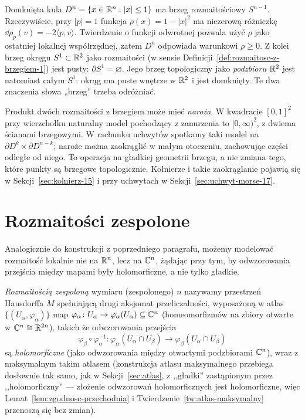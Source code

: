 \begin{przyklad}
\label{prz:brzeg-kula-okrag-1}
Domknięta kula $D^n=\{x\in\mathbb{R}^n:|x|\leq1\}$ ma brzeg
rozmaitościowy $S^{n-1}$. Rzeczywiście, przy $|p|=1$
funkcja $\rho(x)=1-|x|^2$ ma niezerową różniczkę
$\dd\rho_p(v)=-2\langle p,v\rangle$. Twierdzenie o funkcji
odwrotnej pozwala użyć $\rho$ jako ostatniej lokalnej
współrzędnej, zatem $D^n$ odpowiada warunkowi $\rho\geq0$.
Z kolei brzeg okręgu $S^1\subset\mathbb{R}^2$ jako rozmaitości
(w sensie Definicji~\ref{def:rozmaitosc-z-brzegiem-1})
jest pusty: $\partial S^1=\varnothing$. Jego brzeg topologiczny
jako \emph{podzbioru $\mathbb{R}^2$} jest natomiast całym $S^1$: okrąg ma
puste wnętrze w $\mathbb{R}^2$ i jest domknięty.
Te dwa znaczenia słowa „brzeg” trzeba odróżniać.
\end{przyklad}

Produkt dwóch rozmaitości z brzegiem może mieć
\emph{naroża}. W kwadracie $[0,1]^2$ przy wierzchołku
naturalny model pochodzący z zanurzenia to
$[0,\infty)^2$, z dwiema ścianami brzegowymi.
W rachunku uchwytów spotkamy taki model na
$\partial D^k\times\partial D^{n-k}$; naroże można
zaokrąglić w małym otoczeniu, zachowując części
odległe od niego. To operacja na gładkiej geometrii
brzegu, a nie zmiana tego, które punkty są brzegowe
topologicznie. Kołnierze i takie zaokrąglanie pojawią się
w Sekcji~\ref{sec:kolnierz-15} i przy uchwytach w
Sekcji~\ref{sec:uchwyt-morse-17}.

\section{Rozmaitości zespolone}

Analogicznie do konstrukcji z poprzedniego paragrafu, możemy modelować rozmaitość lokalnie
nie na $\mathbb{R}^n$, lecz na $\mathbb{C}^n$, żądając przy tym, by odwzorowania przejścia między mapami
były holomorficzne, a nie tylko gładkie.

\begin{definicja}
\emph{Rozmaitością zespoloną} wymiaru (zespolonego) $n$ nazywamy przestrzeń Hausdorffa $M$
spełniającą drugi aksjomat przeliczalności, wyposażoną w atlas $\{(U_\alpha,\varphi_\alpha)\}$
map $\varphi_\alpha\colon U_\alpha\to\varphi_\alpha(U_\alpha)\subseteq\mathbb{C}^n$ (homeomorfizmów
na zbiory otwarte w $\mathbb{C}^n\cong\mathbb{R}^{2n}$), takich że odwzorowania przejścia
\[
\varphi_\beta\circ\varphi_\alpha^{-1}\colon\varphi_\alpha(U_\alpha\cap U_\beta)\to
\varphi_\beta(U_\alpha\cap U_\beta)
\]
są \emph{holomorficzne} (jako odwzorowania między otwartymi podzbiorami $\mathbb{C}^n$), wraz z
maksymalnym takim atlasem (konstrukcja atlasu maksymalnego przebiega dosłownie tak samo,
jak w Sekcji~\ref{sec:atlas}, z ,,gładki'' zastąpionym przez ,,holomorficzny'' — złożenie odwzorowań
holomorficznych jest holomorficzne, więc Lemat~\ref{lem:zgodnosc-przechodnia} i
Twierdzenie~\ref{tw:atlas-maksymalny} przenoszą się bez zmian).
\end{definicja}

